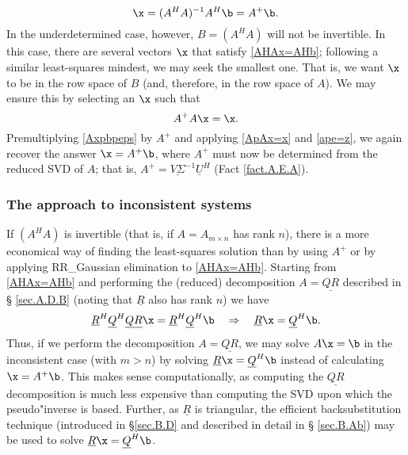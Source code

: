 \begin{equation}
\x=(A^{H} A)^{-1}A^{H}\b=A^{+}\b.
\label{Aplussol}
\end{equation}
In the underdetermined case, however, $B=(A^{H} A)$ will not be
invertible.  In this case, there are several vectors $\x$ that satisfy
\eqref{AHAx=AHb}; following a similar least-squares mindest, we may
seek the smallest one.  That is, we want $\x$ to be in the row space
of $B$ (and, therefore, in the row space of $A$).  We may ensure this
by selecting an $\x$ such that
\begin{equation}
A^{+} A\x=\x.
\label{ApAx=x}
\end{equation}
Premultiplying \eqref{Axpbpeps} by $A^{+}$ and applying \eqref{ApAx=x}
and \eqref{ape=z}, we again recover the answer $\x=A^{+}\b$, where
$A^{+}$ must now be determined from the reduced SVD of $A$; that is, $A^{+}=\underline{V \Sigma}^{-1} \underline{U}^{H}$ (Fact \ref{fact.A.E.A}).

\subsubsection{The  approach to inconsistent systems}\label{sec:QRinconsys}

If $(A^{H} A)$ is invertible (that is, if $A=A_{m\times n}$ has rank
$n$), there is a more economical way of finding the least-squares
solution than by using $A^{+}$ or by applying RR_Gaussian elimination to
\eqref{AHAx=AHb}.  Starting from \eqref{AHAx=AHb} and performing the
(reduced) decomposition $A=\underline{QR}$ described in \S
\ref{sec.A.D.B} (noting that $\underline{R}$ also has rank $n$) we
have
\begin{equation*}
    \underline{R}^{H} \underline{Q}^{H} \underline{Q R} \x = \underline{R}^{H} \underline{Q}^{H} \b \quad \Rightarrow \quad
    \underline{R}\x=\underline{Q}^{H} \b.
\end{equation*}
Thus, if we perform the decomposition $A=\underline{QR}$, we may solve
$A\x=\b$ in the inconsistent case (with $m>n$) by solving
$\underline{R}\x=\underline{Q}^{H} \b$ instead of calculating
$\x=A^{+}\b$.  This makes sense computationally, as computing
the $\underline{QR}$ decomposition is much less expensive than
computing the SVD upon which the pseudo"inverse is based.  Further, as
$\underline{R}$ is triangular, the efficient backsubstitution
technique (introduced in \S \ref{sec.B.D} and described in detail in \S
\ref{sec.B.Ab}) may be used to solve $\underline{R}\x=\underline{Q}^{H}
\b$.

